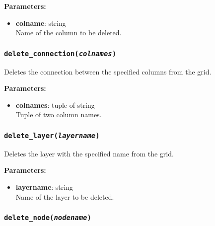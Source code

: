 \textbf{Parameters:}
\begin{itemize}
\item \textbf{colname}: string\\
  Name of the column to be deleted.
\end{itemize}

\begin{snugshade}\subsubsection{\texttt{delete\_connection(\emph{colnames})}}\end{snugshade}
\label{sec:mulgrid:delete_connection}

Deletes the connection between the specified columns from the grid.

\textbf{Parameters:}
\begin{itemize}
\item \textbf{colnames}: tuple of string\\
  Tuple of two column names.
\end{itemize}

\begin{snugshade}\subsubsection{\texttt{delete\_layer(\emph{layername})}}\end{snugshade}
\label{sec:mulgrid:delete_layer}

Deletes the layer with the specified name from the grid.

\textbf{Parameters:}
\begin{itemize}
\item \textbf{layername}: string\\
  Name of the layer to be deleted.
\end{itemize}

\begin{snugshade}\subsubsection{\texttt{delete\_node(\emph{nodename})}}\end{snugshade}
\label{sec:mulgrid:delete_node}

